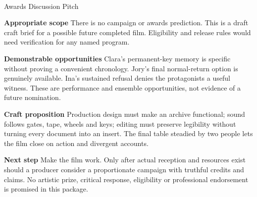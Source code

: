 \documentclass[11pt,letterpaper]{article}
\begin{document}
\begin{center}
{\Large\bfseries\sffamily \filmtitleupper}\\[6pt]
Awards Discussion Pitch
\end{center}
\textbf{Appropriate scope} There is no campaign or awards prediction. This is a draft craft brief for a possible future completed film. Eligibility and release rules would need verification for any named program.

\textbf{Demonstrable opportunities} Clara's permanent-key memory is specific without proving a convenient chronology. Jory's final normal-return option is genuinely available. Ina's sustained refusal denies the protagonists a useful witness. These are performance and ensemble opportunities, not evidence of a future nomination.

\textbf{Craft proposition} Production design must make an archive functional; sound follows gates, tape, wheels and keys; editing must preserve legibility without turning every document into an insert. The final table steadied by two people lets the film close on action and divergent accounts.

\textbf{Next step} Make the film work. Only after actual reception and resources exist should a producer consider a proportionate campaign with truthful credits and claims. No artistic prize, critical response, eligibility or professional endorsement is promised in this package.
\end{document}
